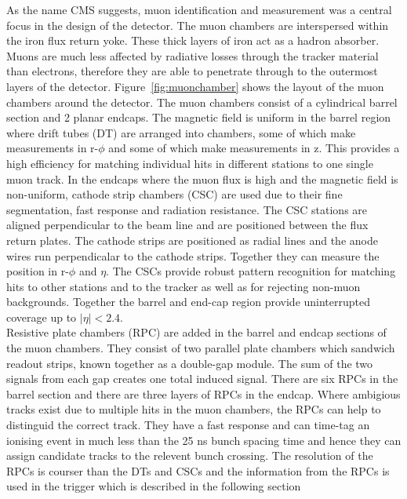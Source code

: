 As the name CMS suggests, muon identification and measurement was a central focus in the design of the detector. The muon chambers are interspersed within the iron flux return yoke. These thick layers of iron act as a hadron absorber. Muons are much less affected by radiative losses through the tracker material than electrons, therefore they are able to penetrate through to the outermost layers of the detector. Figure~\ref{fig:muonchamber} shows the layout of the muon chambers around the detector. The muon chambers consist of a cylindrical barrel section and 2 planar endcaps. The magnetic field is uniform in the barrel region where drift tubes (DT) are arranged into chambers, some of which make measurements in r-$\phi$ and some of which make measurements in z. This provides a high efficiency for matching individual hits in different stations to one single muon track.
In the endcaps where the muon flux is high and the magnetic field is non-uniform, cathode strip chambers (CSC) are used due to their fine segmentation, fast response and radiation resistance. The CSC stations are aligned perpendicular to the beam line and are positioned between the flux return plates. The cathode strips are positioned as radial lines and the anode wires run perpendicalar to the cathode strips. Together they can measure the position in r-$\phi$ and $\eta$. The CSCs provide robust pattern recognition for matching hits to other stations and to the tracker as well as for rejecting non-muon backgrounds. 
Together the barrel and end-cap region provide uninterrupted coverage up to $|\eta|<2.4$.\\
Resistive plate chambers (RPC) are added in the barrel and endcap sections of the muon chambers. They consist of two parallel plate chambers which sandwich readout strips, known together as a double-gap module. The sum of the two signals from each gap creates one total induced signal. There are six RPCs in the barrel section and there are three layers of RPCs in the endcap.
 Where ambigious tracks exist due to multiple hits in the muon chambers, the RPCs can help to distinguid the correct track. They have a fast response and can time-tag an ionising event in much less than the 25 ns bunch spacing time and hence they can assign candidate tracks to the relevent bunch crossing. The resolution of the RPCs is courser than the DTs and CSCs and the information from the RPCs is used in the trigger which is described in the following section

